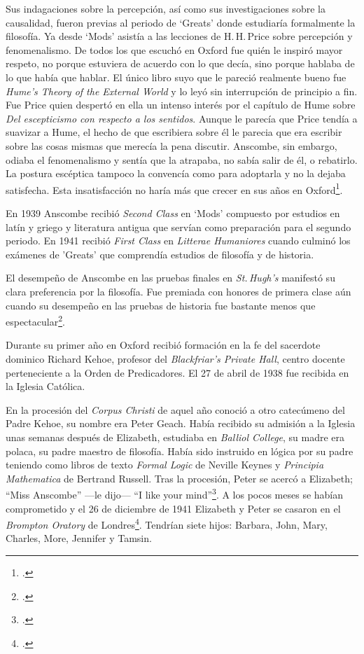 Sus indagaciones sobre la percepción, así como sus investigaciones sobre la causalidad, fueron previas al periodo de `Greats' donde estudiaría formalmente la filosofía. Ya desde `Mods' asistía a las lecciones de H.\,H.\,Price sobre percepción y fenomenalismo. De todos los que escuchó en Oxford fue quién le inspiró mayor respeto, no porque estuviera de acuerdo con lo que decía, sino porque hablaba de lo que había que hablar. El único libro suyo que le pareció realmente bueno fue \emph{Hume's Theory of the External World} y lo leyó sin interrupción de principio a fin. Fue Price quien despertó en ella un intenso interés por el capítulo de Hume sobre \emph{Del escepticismo con respecto a los sentidos}. Aunque le parecía que Price tendía a suavizar a Hume, el hecho de que escribiera sobre él le parecia que era escribir sobre las cosas mismas que merecía la pena discutir. Anscombe, sin embargo, odiaba el fenomenalismo y sentía que la atrapaba, no sabía salir de él, o rebatirlo. La postura escéptica tampoco la convencía como para adoptarla y no la dejaba satisfecha. Esta insatisfacción no haría más que crecer en sus años en Oxford\footcites[Cf.][viii]{anscombe1981metaphysics} [y][26]{torralba2005accion}.

En 1939 Anscombe recibió \emph{Second Class} en `Mods' compuesto por estudios en latín y griego y literatura antigua que servían como preparación para el segundo periodo. En 1941 recibió \emph{First Class} en \emph{Litterae Humaniores} cuando culminó los exámenes de 'Greats' que comprendía estudios de filosofía y de historia.

El desempeño de Anscombe en las pruebas finales en \emph{St.\,Hugh's} manifestó su clara preferencia por la filosofía. Fue premiada con honores de primera clase aún cuando su desempeño en las pruebas de historia fue bastante menos que espectacular\footcite[Cf.][3]{teichmann2008ans}.

Durante su primer año en Oxford recibió formación en la fe del sacerdote dominico Richard Kehoe, profesor del \emph{Blackfriar's Private Hall}, centro docente perteneciente a la Orden de Predicadores. El 27 de abril de 1938 fue recibida en la Iglesia Católica.

En la procesión del \emph{Corpus Christi} de aquel año conoció a otro catecúmeno del Padre Kehoe, su nombre era Peter Geach. Había recibido su admisión a la Iglesia unas semanas después de Elizabeth, estudiaba en \emph{Balliol College}, su madre era polaca, su padre maestro de filosofía. Había sido instruido en lógica por su padre teniendo como libros de texto \emph{Formal Logic} de Neville Keynes y \emph{Principia Mathematica} de Bertrand Russell. Tras la procesión, Peter se acercó a Elizabeth; \enquote{Miss Anscombe} ---le dijo--- \enquote{I like your mind}\footcite[Cf.][187]{kenny2016fellows}. A los pocos meses se habían comprometido y el 26 de diciembre de 1941 Elizabeth y Peter se casaron en el \emph{Brompton Oratory} de Londres\footcite[Cf.][33]{teichman2002fellows}. Tendrían siete hijos: Barbara, John, Mary, Charles, More, Jennifer y Tamsin.

